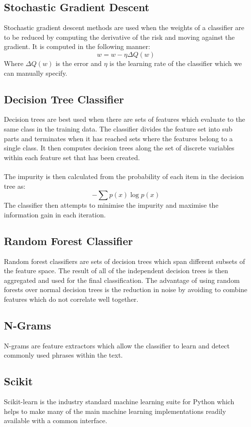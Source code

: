 \documentclass[12pt,twoside]{report}
\begin{document}
\subsection{Stochastic Gradient Descent}
Stochastic gradient descent methods are used when the weights of a classifier are to be reduced by computing the derivative of the risk and moving against the gradient. It is computed in the following manner:
$$w = w - \eta \Delta Q(w)$$
Where $\Delta Q(w)$ is the error and $\eta$ is the learning rate of the classifier which we can manually specify.
\subsection{Decision Tree Classifier}
Decision trees are best used when there are sets of features which evaluate to the same class in the training data. The classifier divides the feature set into sub parts and terminates when it has reached sets where the features belong to a single class. It then computes decision trees along the set of discrete variables within each feature set that has been created.
\\\\
The impurity is then calculated from the probability of each item in the decision tree as:
$$ - \sum p(x) \log p(x)$$
The classifier then attempts to minimise the impurity and maximise the information gain in each iteration.
\subsection{Random Forest Classifier}
Random forest classifiers are sets of decision trees which span different subsets of the feature space. The result of all of the independent decision trees is then aggregated and used for the final classification. The advantage of using random forests over normal decision trees is the reduction in noise by avoiding to combine features which do not correlate well together.
\subsection{N-Grams}
N-grams are feature extractors which allow the classifier to learn and detect commonly used phrases within the text.
\subsection{Scikit}
Scikit-learn is the industry standard machine learning suite for Python which helps to make many of the main machine learning implementations readily available with a common interface.
\end{document}

